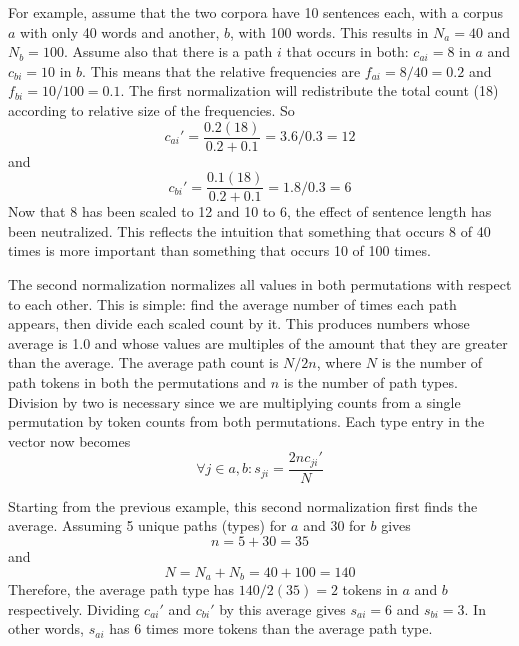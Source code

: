 \documentclass[11pt,letterpaper]{article}
\begin{document}
For example, assume that the two corpora have 10 sentences each, with
a corpus $a$ with only 40 words and another, $b$, with 100 words. This
results in $N_a = 40$ and $N_b = 100$. Assume also that there is a
path $i$ that occurs in both: $c_{ai} = 8$ in  $a$ and $c_{bi} = 10$ in
$b$. This means that the relative frequencies are $f_{ai} = 8/40 = 0.2$
and $f_{bi} = 10/100 = 0.1$. The first normalization will redistribute the
total count (18) according to relative size of the frequencies. So
\[c_{ai}' = \frac{0.2(18)}{0.2+0.1} = 3.6 / 0.3 = 12\] and
\[c_{bi}' = \frac{0.1(18)}{0.2+0.1} = 1.8 / 0.3 = 6\]
Now that 8 has been scaled to 12 and 10 to 6, the effect of sentence length
has been neutralized. This reflects the intuition that something that
occurs 8 of 40 times is more important than something that occurs 10
of 100 times.

The second normalization normalizes all values in both
permutations with respect to each other. This is simple: find the
average number of times each path appears, then divide each scaled
count by it. This produces numbers whose average is 1.0 and whose
values are multiples of the amount that they are greater than the average.
The average path
count is $N / 2n$, where $N$ is the number of path tokens in
both the permutations and $n$ is the number of path types. Division by
two is necessary since we are multiplying counts from a single permutation by
token counts from both permutations. Each type entry in the
vector now becomes \[\forall j \in a,b : s_{ji} = \frac{2nc_{ji}'}{N}\]

Starting from the previous example, this second normalization first
finds the average. Assuming 5 unique paths (types) for $a$ and 30 for
$b$ gives \[n = 5 + 30 = 35\] and
\[N = N_a + N_b = 40 + 100 = 140\]
Therefore, the average path type has $140 / 2(35) = 2$
tokens in $a$ and $b$ respectively. Dividing $c_{ai}'$ and $c_{bi}'$ by this average gives $s_{ai} = 6$
and $s_{bi} = 3$. In other words, $s_{ai}$ has 6 times more tokens
than the average path type.

\end{document}
